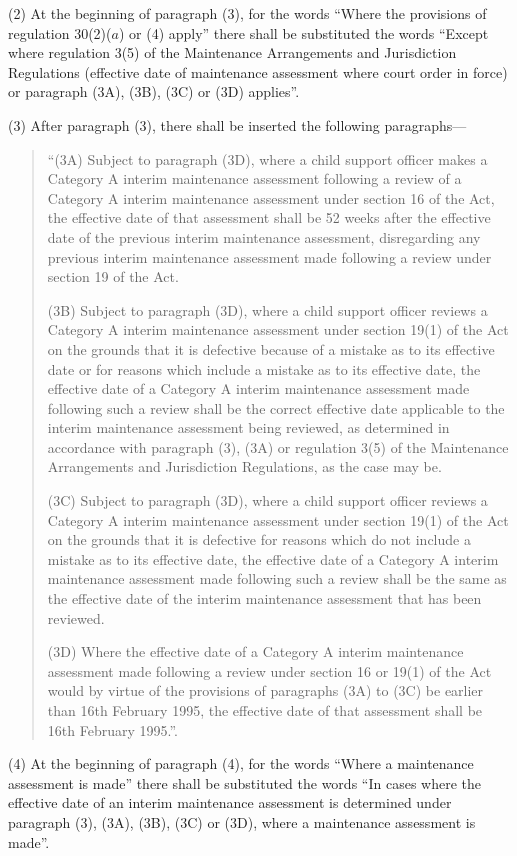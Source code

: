 \documentclass[a4paper]{article}
\begin{document}
(2) At the beginning of paragraph (3), for the words “Where the provisions of regulation 30(2)($a$) or (4) apply” there shall be substituted the words “Except where regulation 3(5) of the Maintenance Arrangements and Jurisdiction Regulations (effective date of maintenance assessment where court order in force) or paragraph (3A), (3B), (3C) or (3D) applies”.

(3) After paragraph (3), there shall be inserted the following paragraphs—
\begin{quotation}
“(3A) Subject to paragraph (3D), where a child support officer makes a Category A interim maintenance assessment following a review of a Category A interim maintenance assessment under section 16 of the Act, the effective date of that assessment shall be 52 weeks after the effective date of the previous interim maintenance assessment, disregarding any previous interim maintenance assessment made following a review under section 19 of the Act.

(3B) Subject to paragraph (3D), where a child support officer reviews a Category A interim maintenance assessment under section 19(1) of the Act on the grounds that it is defective because of a mistake as to its effective date or for reasons which include a mistake as to its effective date, the effective date of a Category A interim maintenance assessment made following such a review shall be the correct effective date applicable to the interim maintenance assessment being reviewed, as determined in accordance with paragraph (3), (3A) or regulation 3(5) of the Maintenance Arrangements and Jurisdiction Regulations, as the case may be.

(3C) Subject to paragraph (3D), where a child support officer reviews a Category A interim maintenance assessment under section 19(1) of the Act on the grounds that it is defective for reasons which do not include a mistake as to its effective date, the effective date of a Category A interim maintenance assessment made following such a review shall be the same as the effective date of the interim maintenance assessment that has been reviewed.

(3D) Where the effective date of a Category A interim maintenance assessment made following a review under section 16 or 19(1) of the Act would by virtue of the provisions of paragraphs (3A) to (3C) be earlier than 16th February 1995, the effective date of that assessment shall be 16th February 1995.”.
\end{quotation}

(4) At the beginning of paragraph (4), for the words “Where a maintenance assessment is made” there shall be substituted the words “In cases where the effective date of an interim maintenance assessment is determined under paragraph (3), (3A), (3B), (3C) or (3D), where a maintenance assessment is made”.
\end{document}
